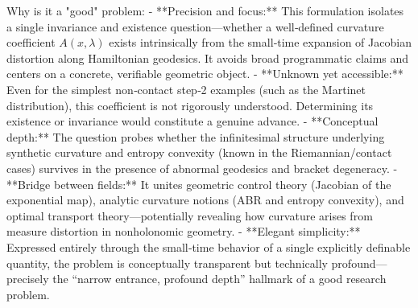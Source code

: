 Why is it a "good" problem:  
- **Precision and focus:** This formulation isolates a single invariance and existence question—whether a well‑defined curvature coefficient \(A(x,\lambda)\) exists intrinsically from the small‑time expansion of Jacobian distortion along Hamiltonian geodesics. It avoids broad programmatic claims and centers on a concrete, verifiable geometric object.  
- **Unknown yet accessible:** Even for the simplest non‑contact step‑2 examples (such as the Martinet distribution), this coefficient is not rigorously understood. Determining its existence or invariance would constitute a genuine advance.  
- **Conceptual depth:** The question probes whether the infinitesimal structure underlying synthetic curvature and entropy convexity (known in the Riemannian/contact cases) survives in the presence of abnormal geodesics and bracket degeneracy.  
- **Bridge between fields:** It unites geometric control theory (Jacobian of the exponential map), analytic curvature notions (ABR and entropy convexity), and optimal transport theory—potentially revealing how curvature arises from measure distortion in nonholonomic geometry.  
- **Elegant simplicity:** Expressed entirely through the small‑time behavior of a single explicitly definable quantity, the problem is conceptually transparent but technically profound—precisely the “narrow entrance, profound depth” hallmark of a good research problem.